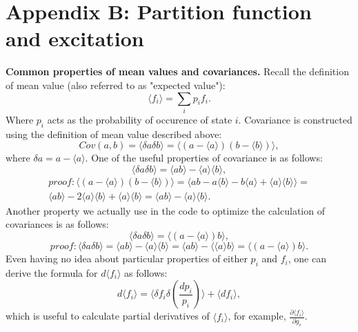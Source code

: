 \section{Appendix B: Partition function and excitation}
{\bf Common properties of mean values and covariances.}
Recall the definition of mean value (also referred to as "expected value"):
\begin{equation}
\langle f_i \rangle = \sum_i p_i f_i.
\end{equation}
Where $p_i$ acts as the probability of occurence of state $i$.
Covariance is constructed using the definition of mean value described above:
\begin{equation}
Cov(a,b) = \langle \delta a \delta b \rangle =
\langle (a - \langle a \rangle) (b - \langle b \rangle) \rangle,
\end{equation}
where $\delta a = a - \langle a \rangle$.
One of the useful properties of covariance is as follows:
\begin{equation}
\langle \delta a \delta b \rangle = \langle ab \rangle - \langle a \rangle \langle b \rangle,
\end{equation}
\begin{eqnarray}
\nonumber proof: \langle (a - \langle a \rangle) (b - \langle b \rangle) \rangle =
\langle ab - a \langle b \rangle - b \langle a \rangle + \langle a \rangle \langle b \rangle \rangle = \\ \nonumber
\langle ab \rangle - 2 \langle a \rangle \langle b \rangle + \langle a \rangle \langle b \rangle =
\langle ab \rangle - \langle a \rangle \langle b \rangle.
\end{eqnarray}
Another property we actually use in the code to optimize the
calculation of covariances is as follows:
\begin{equation}
\langle \delta a \delta b \rangle = \langle (a - \langle a \rangle) b \rangle,
\end{equation}
\begin{equation}
\nonumber proof: \langle \delta a \delta b \rangle =
\langle ab \rangle - \langle a \rangle \langle b \rangle =
\langle ab \rangle - \langle \langle a \rangle b \rangle =
\langle (a - \langle a \rangle) b \rangle.
\end{equation}
Even having no idea about particular properties of either $p_i$ and $f_i$,
one can derive the formula for $d \langle f_i \rangle$ as follows:
\begin{equation}\label{differmean}
d \langle f_i \rangle = \langle \delta f_i \delta \left( \frac{d p_i}{p_i} \right) \rangle +
\langle d f_i \rangle,
\end{equation}
which is useful to calculate partial derivatives of $\langle f_i \rangle$,
for example, $\frac{\partial \langle f_i \rangle}{\partial g_e}$.

